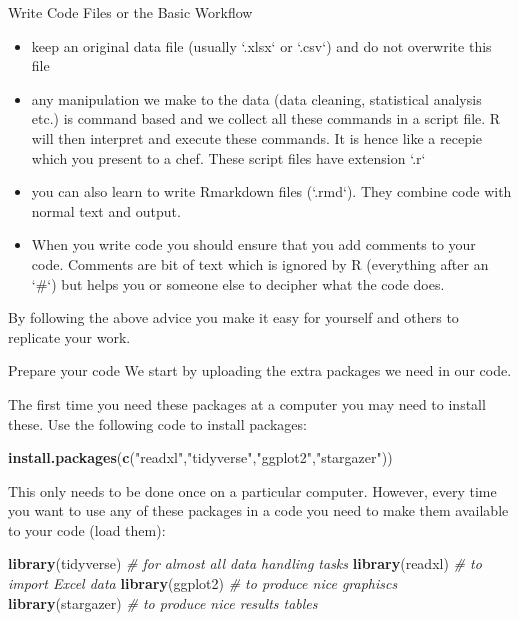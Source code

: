 \documentclass[
  ignorenonframetext,
]{beamer}
\newenvironment{Shaded}{\begin{snugshade}}{\end{snugshade}}
\newcommand{\CommentTok}[1]{\textcolor[rgb]{0.56,0.35,0.01}{\textit{#1}}}
\newcommand{\FunctionTok}[1]{\textcolor[rgb]{0.13,0.29,0.53}{\textbf{#1}}}
\newcommand{\NormalTok}[1]{#1}
\newcommand{\StringTok}[1]{\textcolor[rgb]{0.31,0.60,0.02}{#1}}
\begin{document}
\begin{frame}{Write Code Files or the Basic Workflow}
\label{write-code-files-or-the-basic-workflow}
\begin{itemize}
  \item keep an original data file (usually `.xlsx` or `.csv`) and do not overwrite this file
  \item any manipulation we make to the data (data cleaning, statistical analysis etc.) is command based and we collect all these commands in a script file. R will then interpret and execute these commands. It is hence like a recepie which you present to a chef. These script files have extension `.r`
  \item you can also learn to write Rmarkdown files (`.rmd`). They combine code with normal text and output. 
  \item When you write code you should ensure that you add comments to your code. Comments are bit of text which is ignored by R (everything after an `\#`) but helps you or someone else to decipher what the code does.

\end{itemize}

By following the above advice you make it easy for yourself and others
to replicate your work.
\end{frame}

\begin{frame}[fragile]{Prepare your code}
\label{prepare-your-code}
We start by uploading the extra packages we need in our code.

The first time you need these packages at a computer you may need to
install these. Use the following code to install packages:

\begin{Shaded}
\begin{Highlighting}[]
\FunctionTok{install.packages}\NormalTok{(}\FunctionTok{c}\NormalTok{(}\StringTok{"readxl"}\NormalTok{,}\StringTok{"tidyverse"}\NormalTok{,}\StringTok{"ggplot2"}\NormalTok{,}\StringTok{"stargazer"}\NormalTok{))}
\end{Highlighting}
\end{Shaded}

This only needs to be done once on a particular computer. However, every
time you want to use any of these packages in a code you need to make
them available to your code (load them):

\begin{Shaded}
\begin{Highlighting}[]
\FunctionTok{library}\NormalTok{(tidyverse)    }\CommentTok{\# for almost all data handling tasks}
\FunctionTok{library}\NormalTok{(readxl)       }\CommentTok{\# to import Excel data}
\FunctionTok{library}\NormalTok{(ggplot2)      }\CommentTok{\# to produce nice graphiscs}
\FunctionTok{library}\NormalTok{(stargazer)    }\CommentTok{\# to produce nice results tables}
\end{Highlighting}
\end{Shaded}
\end{frame}
\end{document}
